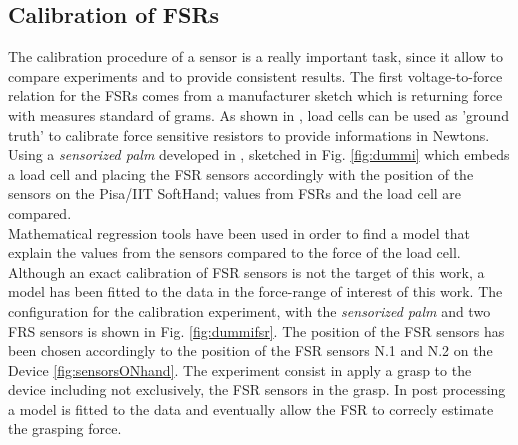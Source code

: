 
\subsection{Calibration of FSRs}
The calibration procedure of a sensor is a really important task, since it allow to compare experiments and to provide consistent results. 
The first voltage-to-force relation for the FSRs comes from a manufacturer sketch which is returning force with measures standard of grams.
As shown in \cite{calibFSR}, load cells can be used as 'ground truth' to calibrate force sensitive resistors to provide informations in Newtons. 
Using a \textit{sensorized palm} developed in \cite{espen}, sketched in Fig. \ref{fig:dummi} which embeds a load cell and placing the FSR sensors accordingly with the position of the sensors on the Pisa/IIT SoftHand; values from FSRs and the load cell are compared.\\
Mathematical regression tools have been used in order to find a model that explain the values from the sensors compared to the force of the load cell.
Although an exact calibration of FSR sensors is not the target of this work, a model has been fitted to the data in the force-range of interest of this work.
The configuration for the calibration experiment, with the \textit{sensorized palm} and two FRS sensors is shown in Fig. \ref{fig:dummifsr}. 
The position of the FSR sensors has been chosen accordingly to the position of the FSR sensors N.1 and N.2 on the Device \ref{fig:sensorsONhand}.
The experiment consist in apply a grasp to the device including not exclusively, the FSR sensors in the grasp. In post processing a model is fitted to the data and eventually allow the FSR to correcly estimate the grasping force.

